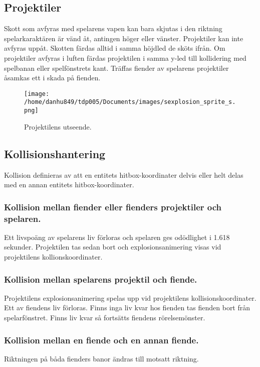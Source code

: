 \documentclass{TDP005mall}
\begin{document}
\subsection{Projektiler}
Skott som avfyras med spelarens vapen kan bara skjutas i den riktning spelarkaraktären är vänd åt, antingen höger eller vänster. Projektiler kan inte avfyras uppåt. Skotten färdas alltid i samma höjdled de sköts ifrån. Om projektiler avfyras i luften färdas projektilen i samma y-led till kollidering med spelbanan eller spelfönstrets kant. Träffas fiender av spelarens projektiler åsamkas ett i skada på fienden.

\begin{figure}[h!]
  \texttt{[image: /home/danhu849/tdp005/Documents/images/sexplosion\_sprite\_s.png]}
  \caption{Projektilens utseende.\label{fig:6}}
\end{figure}

\subsection{Kollisionshantering} %
Kollision definieras av att en entitets hitbox-koordinater delvis eller helt delas med en annan entitets hitbox-koordinater.
\subsubsection*{Kollision mellan fiender eller fienders projektiler och spelaren.\label{section:1}}
Ett livspoäng av spelarens liv förloras och spelaren ges odödlighet i 1.618 sekunder. Projektilen tas sedan bort och explosionsanimering visas vid projektilens kollionskoordinater.

\subsubsection*{Kollision mellan spelarens projektil och fiende.\label{section:2}}
Projektilens explosionsanimering spelas upp vid projektilens kollisionskoordinater. Ett av fiendens liv förloras. Finns inga liv kvar hos fienden tas fienden bort från spelarfönstret. Finns liv kvar så fortsätts fiendens rörelsemönster.

\subsubsection*{Kollision mellan en fiende och en annan fiende.\label{section:3}}
Riktningen på båda fienders banor ändras till motsatt riktning.
\end{document}
